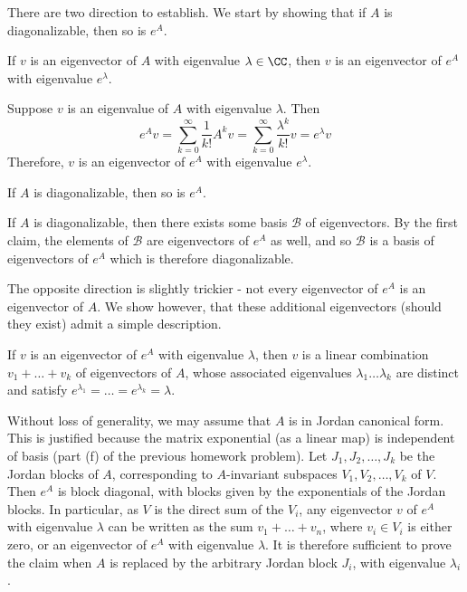 \documentclass{scrartcl}
\begin{document}
\begin{solution} 
        There are two direction to establish. We start by showing that if $A$ is diagonalizable, then so is $e^A$.
        \begin{claimbox}
        If $v$ is an eigenvector of $A$ with eigenvalue $\lambda\in \CC$, then $v$ is an eigenvector of $e^A$ with eigenvalue $e^\lambda$.
        \end{claimbox}
        \begin{subproof}
        Suppose $v$ is an eigenvalue of $A$ with eigenvalue $\lambda$. Then 
        \[e^Av=\sum_{k=0}^{\infty}\frac{1}{k!}A^kv=\sum_{k=0}^{\infty}\frac{\lambda^k}{k!}v=e^\lambda v\]
        Therefore, $v$ is an eigenvector of $e^A$
         with eigenvalue $e^\lambda$.
         \end{subproof}
        
        \begin{claimbox}
        If $A$ is diagonalizable, then so is $e^A$.
        \end{claimbox}
        \begin{subproof}
        If $A$ is diagonalizable, then there exists some basis $\mathcal{B}$ of eigenvectors. By the first claim, the elements of $\mathcal{B}$ are eigenvectors of $e^A$ as well, and so $\mathcal{B}$ is a basis of eigenvectors of $e^A$ which is therefore diagonalizable.
        \end{subproof}
        
        The opposite direction is slightly trickier - not every eigenvector of $e^A$ is an eigenvector of $A$. We show however, that these additional eigenvectors (should they exist) admit a simple description. 
        
        \begin{claimbox}
        If $v$ is an eigenvector of $e^A$ with eigenvalue $\lambda$, then $v$ is a linear combination $v_1+\dots +v_k$ of eigenvectors of $A$, whose associated eigenvalues $\lambda_1\dots \lambda_k$ are distinct and satisfy $e^{\lambda_1}=\dots=e^{\lambda_k}=\lambda$.
        \end{claimbox}
            
        \begin{subproof}
        Without loss of generality, we may assume that $A$ is in Jordan canonical form. This is justified because the matrix exponential (as a linear map) is independent of basis (part (f) of the previous homework problem). Let $J_1,J_2,\dots, J_k$ be the Jordan blocks of $A$, corresponding to $A$-invariant subspaces $V_1,V_2,\dots, V_k$ of $V$. Then $e^A$ is block diagonal, with blocks given by the exponentials of the Jordan blocks. In particular, as $V$ is the direct sum of the $V_i$, any eigenvector $v$ of $e^A$ with eigenvalue $\lambda$ can be written as the sum $v_1+\dots + v_n$, where $v_i\in V_i$ is either zero, or an eigenvector of $e^A$ with eigenvalue $\lambda$. It is therefore sufficient to prove the claim when $A$ is replaced by the arbitrary Jordan block $J_i$, with eigenvalue $\lambda_i$.
        

\end{subproof}
\end{solution}
\end{document}
